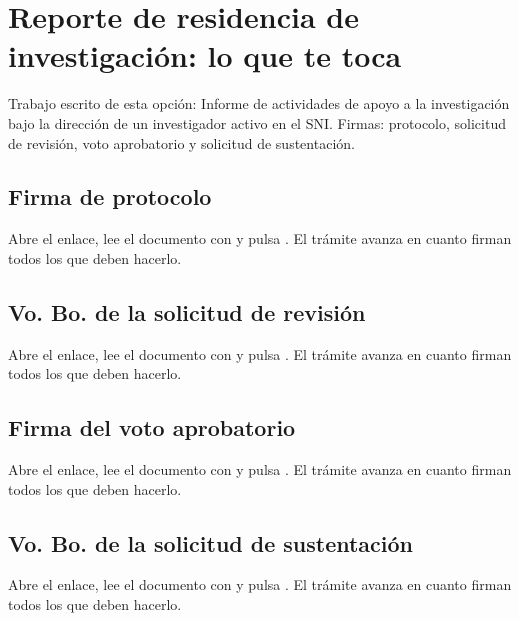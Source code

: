 \section{Reporte de residencia de investigación: lo que te toca}
Trabajo escrito de esta opción: Informe de actividades de apoyo a la investigación bajo la dirección de un investigador activo en el SNI. Firmas: protocolo, solicitud de revisión, voto aprobatorio y solicitud de sustentación.
\subsection{Firma de protocolo}
Abre el enlace, lee el documento con  y pulsa . El trámite avanza en cuanto firman todos los que deben hacerlo.
\subsection{Vo. Bo. de la solicitud de revisión}
Abre el enlace, lee el documento con  y pulsa . El trámite avanza en cuanto firman todos los que deben hacerlo.
\subsection{Firma del voto aprobatorio}
Abre el enlace, lee el documento con  y pulsa . El trámite avanza en cuanto firman todos los que deben hacerlo.
\subsection{Vo. Bo. de la solicitud de sustentación}
Abre el enlace, lee el documento con  y pulsa . El trámite avanza en cuanto firman todos los que deben hacerlo.
